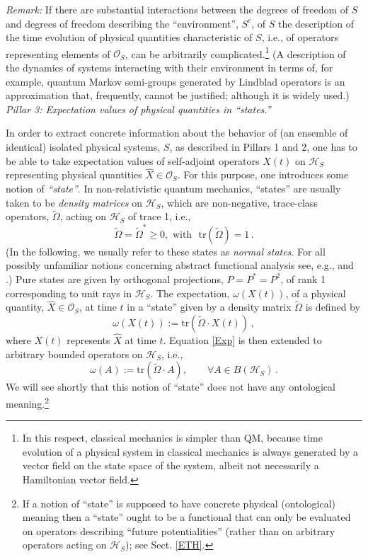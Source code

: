 \documentclass[12pt]{article}
\begin{document}
\textit{Remark:} If there are substantial interactions between the degrees of freedom
of $S$ and degrees of freedom describing the ``environment'', $S^{c}$, of $S$ the description of the time evolution
of physical quantities characteristic of $S$, i.e., of operators representing elements of $\mathcal{O}_S$, can be
arbitrarily complicated.\footnote{In this respect, classical mechanics is simpler than QM, because time evolution
of a physical system in classical mechanics is always generated by a vector field on the state space of the system,
albeit not necessarily a Hamiltonian vector field.}
(A description of the dynamics of systems interacting with their environment in terms of, for example,
quantum Markov semi-groups generated by Lindblad operators is an approximation that, frequently,
cannot be justified; although it is widely used.)\\

\textit{{Pillar 3}: Expectation values of physical quantities in ``states.''}

In order to extract concrete information about the behavior of (an ensemble of identical) isolated physical systems, $S$,
as described in Pillars 1 and 2, one has to be able to take expectation values of self-adjoint operators $X(t)$ on
$\mathcal{H}_S$ representing physical quantities $\hat{X} \in \mathcal{O}_S$. For this purpose, one introduces
some notion of \textit{``state''}. In non-relativistic quantum mechanics, ``states'' are usually taken to be
\textit{density matrices} on $\mathcal{H}_S$, which are non-negative, trace-class operators, $\widetilde{\Omega}$,
acting on $\mathcal{H}_S$ of trace 1, i.e.,
\begin{equation}\label{density matrix}
\widetilde{\Omega} = \widetilde{\Omega}^{*} \geq 0,\,\,\text {with }\,\, \text{tr}(\widetilde{\Omega}) =1\,.
\end{equation}
(In the following, we usually refer to these states as \textit{normal states}. For all possibly unfamiliar notions concerning  abstract functional analysis see, e.g.,  \cite{Lanford} and \cite{Takesaki}.) Pure states are given by orthogonal projections, $P=P^{*}=P^{2}$, of rank 1 corresponding to unit rays in $\mathcal{H}_S$.
The expectation, $\omega(X(t))$, of a physical quantity, $\hat{X}\in \mathcal{O}_S$, at time $t$ in a ``state'' given by a density matrix $\widetilde{\Omega}$ is defined by
\begin{equation}\label{Exp}
\omega(X(t)):= \text{tr}(\widetilde{\Omega}\cdot X(t))\,,
\end{equation}
where $X(t)$ represents $\hat{X}$ at time $t$. Equation \eqref{Exp} is then extended to arbitrary bounded operators on $\mathcal{H}_S$, i.e.,
$$\omega(A):= \text{tr}(\widetilde{\Omega}\cdot A), \qquad \forall A \in B(\mathcal{H}_S)\,.$$
We will see shortly that this notion of ``state'' does not have any ontological meaning.\footnote{If a notion of ``state'' is
supposed to have concrete physical (ontological) meaning then a ``state'' ought to be a functional that can only be evaluated
on operators describing ``future potentialities'' (rather than on arbitrary operators acting on $\mathcal{H}_S$);
see Sect. \ref{ETH}.}
\end{document}
